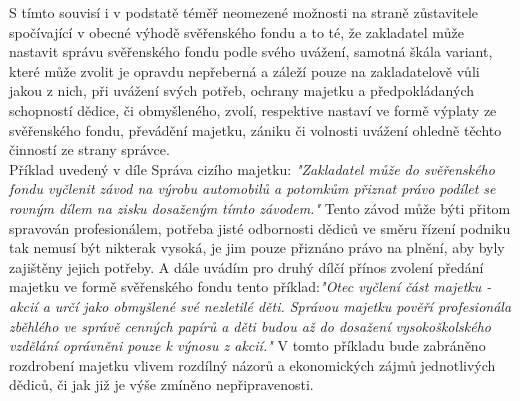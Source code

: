 \documentclass{article}
\begin{document}
S tímto souvisí i v podstatě téměř neomezené možnosti na straně zůstavitele spočívající v obecné výhodě svěřenského fondu a to té, že zakladatel může nastavit správu svěřenského fondu podle svého uvážení, samotná škála variant, které může zvolit je opravdu nepřeberná a záleží pouze na zakladatelově vůli jakou z nich, při uvážení svých potřeb, ochrany majetku a předpokládaných schopností dědice, či obmyšleného, zvolí, respektive nastaví ve formě výplaty ze svěřenského fondu, převádění majetku, zániku či volnosti uvážení ohledně těchto činností ze strany správce.\\

 
 
 Příklad uvedený v díle Správa cizího majetku: \textit{"Zakladatel může  do svěřenského fondu vyčlenit závod na výrobu automobilů a potomkům přiznat právo podílet se rovným dílem na zisku dosaženým tímto závodem."} Tento závod může býti přitom spravován profesionálem, potřeba jisté odbornosti dědiců ve směru řízení podniku tak nemusí být nikterak vysoká, je jim pouze přiznáno právo na plnění, aby byly zajištěny jejich potřeby. A dále uvádím pro druhý dílčí přínos zvolení předání majetku ve formě svěřenského fondu tento příklad:\textit{"Otec vyčlení část majetku - akcií a určí jako obmyšlené své nezletilé děti. Správou majetku pověří profesionála zběhlého ve správě cenných papírů a děti budou až do dosažení vysokoškolského vzdělání oprávněni pouze k výnosu z akcií."} V tomto příkladu bude zabráněno rozdrobení majetku vlivem rozdílný názorů a ekonomických zájmů jednotlivých dědiců, či jak již je výše zmíněno nepřipravenosti.\\
 
 
 
\end{document}
